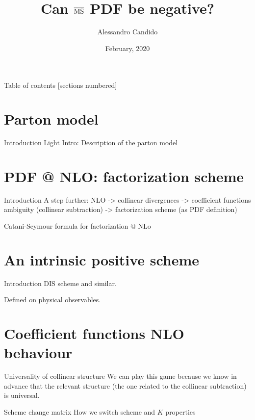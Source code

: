 \documentclass[9pt]{beamer}
\title{Can $\operatorname{\overline{MS}}$ PDF be negative?}
\date{February, 2020}
\author{Alessandro Candido
}
\begin{document}
\maketitle

\begin{frame}{Table of contents}
  [sections numbered]
    \tableofcontents%
\end{frame}

\section{Parton model}
\begin{frame}{Introduction}
    Light Intro: Description of the parton model
\end{frame}

\section{PDF @ NLO: factorization scheme}
\begin{frame}{Introduction}
    A step further: NLO -> collinear divergences -> coefficient functions ambiguity (collinear subtraction) -> factorization scheme (as PDF definition)

    Catani-Seymour formula for factorization @ NLo
\end{frame}

\section{An intrinsic positive scheme}
\begin{frame}{Introduction}
    DIS scheme and similar.

    Defined on physical observables.
\end{frame}

\section{Coefficient functions NLO behaviour}
\begin{frame}{Universality of collinear structure}
    We can play this game because we know in advance that the relevant structure (the one related to the collinear subtraction) is universal.
\end{frame}

\begin{frame}{Scheme change matrix}
    How we switch scheme and $K$ properties
\end{frame}
\end{document}
